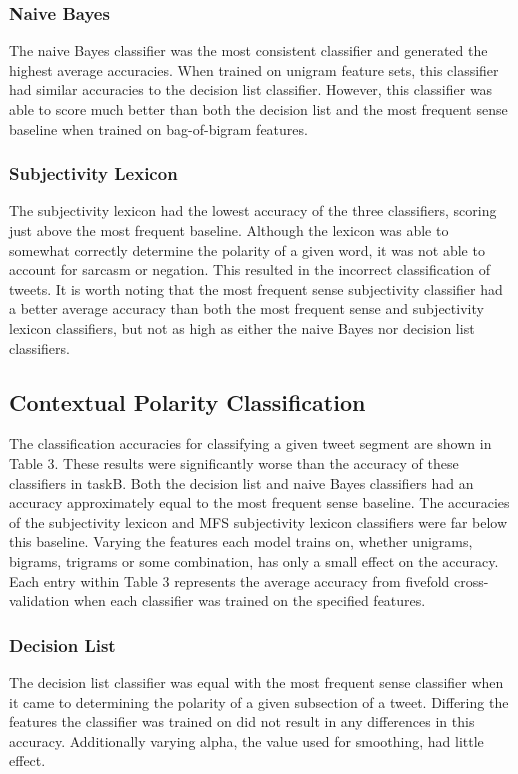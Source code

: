 \documentclass[11pt]{article}
\begin{document}
\subsubsection*{Naive Bayes}
The naive Bayes classifier was the most consistent classifier and generated the highest average accuracies. When trained on unigram feature sets, this classifier had similar accuracies to the decision list classifier. However, this classifier was able to score much better than both the decision list and the most frequent sense baseline when trained on bag-of-bigram features.

\subsubsection*{Subjectivity Lexicon}
The subjectivity lexicon had the lowest accuracy of the three classifiers, scoring just above the most frequent baseline. Although the lexicon was able to somewhat correctly determine the polarity of a given word, it was not able to account for sarcasm or negation. This resulted in the incorrect classification of tweets. It is worth noting that the most frequent sense subjectivity classifier had a better average accuracy than both the most frequent sense and subjectivity lexicon classifiers, but not as high as either the naive Bayes nor decision list classifiers. 

\subsection{Contextual Polarity Classification}
The classification accuracies for classifying a given tweet segment are shown in Table 3. These results were significantly worse than the accuracy of these classifiers in taskB. Both the decision list and naive Bayes classifiers had an accuracy approximately equal to the most frequent sense baseline. The accuracies of the subjectivity lexicon and MFS subjectivity lexicon classifiers were far below this baseline. Varying the features each model trains on, whether unigrams, bigrams, trigrams or some combination, has only a small effect on the accuracy. Each entry within Table 3 represents the average accuracy from fivefold cross-validation when each classifier was trained on the specified features. 

\subsubsection{Decision List}
The decision list classifier was equal with the most frequent sense classifier when it came to determining the polarity of a given subsection of a tweet. Differing the features the classifier was trained on did not result in any differences in this accuracy. Additionally varying alpha, the value used for smoothing, had little effect.  
\end{document}
